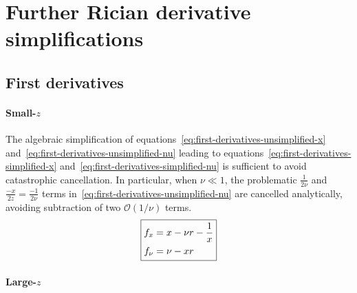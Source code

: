 \documentclass{article}
\begin{document}
%

\section{Further Rician derivative simplifications}

\subsection{First derivatives}

\paragraph{Small-$z$}

The algebraic simplification of equations~\eqref{eq:first-derivatives-unsimplified-x} and~\eqref{eq:first-derivatives-unsimplified-nu} leading to equations~\eqref{eq:first-derivatives-simplified-x} and~\eqref{eq:first-derivatives-simplified-nu} is sufficient to avoid catastrophic cancellation.
In particular, when $\nu \ll 1$, the problematic $\frac{1}{2\nu}$ and $\frac{-x}{2z} = \frac{-1}{2\nu}$ terms in~\eqref{eq:first-derivatives-unsimplified-nu} are cancelled analytically, avoiding subtraction of two $\mathcal{O}(1/\nu)$ terms.
%
\begin{align}\label{eq:first-derivatives-small-z}
  \boxed{%
    \begin{aligned}
      f_x   & = x - \nu r - \frac{1}{x} \\
      f_\nu & = \nu - x r
    \end{aligned}}
\end{align}

\paragraph{Large-$z$}
\end{document}
